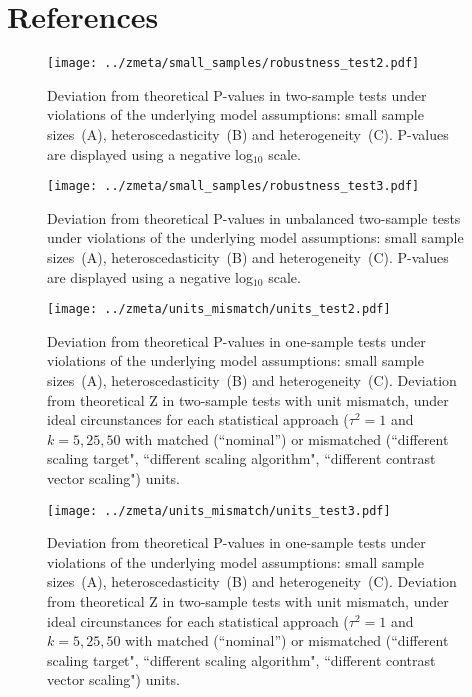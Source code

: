 \documentclass[preprint]{elsarticle}
\newcommand{\nStudies}{k}
\newcommand{\varBetween}{\tau^2}
\newcommand{\beginsupplement}{%
        \setcounter{table}{0}
        \renewcommand{\thetable}{S\arabic{table}}%
        \setcounter{figure}{0}
        \renewcommand{\thefigure}{S\arabic{figure}}%
     }
\begin{document}
%

\section{References}



\beginsupplement


\begin{figure}[h]
	\centering
 	\texttt{[image: ../zmeta/small\_samples/robustness\_test2.pdf]}
	\caption{Deviation from theoretical P-values in two-sample tests under violations of the underlying model assumptions: small sample sizes~(A), heteroscedasticity~(B) and heterogeneity~(C). P-values are displayed using a negative log$_{10}$ scale.}
	\label{fig:robustness_test2}
\end{figure}

\begin{figure}[h]
	\centering
 	\texttt{[image: ../zmeta/small\_samples/robustness\_test3.pdf]}
	\caption{Deviation from theoretical P-values in unbalanced two-sample tests under violations of the underlying model assumptions: small sample sizes~(A), heteroscedasticity~(B) and heterogeneity~(C). P-values are displayed using a negative log$_{10}$ scale.}
	\label{fig:robustness_test3}
\end{figure}

\begin{figure}[h]
	\centering
 	\texttt{[image: ../zmeta/units\_mismatch/units\_test2.pdf]}
	\caption{Deviation from theoretical P-values in one-sample tests under violations of the underlying model assumptions: small sample sizes~(A), heteroscedasticity~(B) and heterogeneity~(C). Deviation from theoretical Z in two-sample tests with unit mismatch, under ideal circunstances for each statistical approach ($\varBetween=1$ and $\nStudies = 5, 25, 50$ with matched (``nominal'') or mismatched (``different scaling target", ``different scaling algorithm", ``different contrast vector scaling") units.}
	\label{fig:units_test2}
\end{figure}

\begin{figure}[h]
	\centering
 	\texttt{[image: ../zmeta/units\_mismatch/units\_test3.pdf]}
	\caption{Deviation from theoretical P-values in one-sample tests under violations of the underlying model assumptions: small sample sizes~(A), heteroscedasticity~(B) and heterogeneity~(C). Deviation from theoretical Z in two-sample tests with unit mismatch, under ideal circunstances for each statistical approach ($\varBetween=1$ and $\nStudies = 5, 25, 50$ with matched (``nominal'') or mismatched (``different scaling target", ``different scaling algorithm", ``different contrast vector scaling") units.}
	\label{fig:units_test3}
\end{figure}
\end{document}
